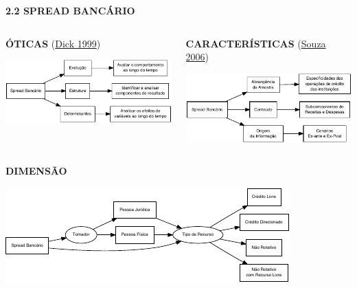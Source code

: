 \documentclass[
  ignorenonframetext,
  aspectratio=169,
  ignorenonframetext]{beamer}
\begin{document}
\begin{frame}{\textbf{2.2 SPREAD BANCÁRIO}}
\protect\hypertarget{spread-bancuxe1rio-1}{}
\begin{columns}[T]
\begin{column}{0.5\textwidth}
\textbf{ÓTICAS} (\protect\hyperlink{ref-dick:1999}{Dick 1999})

\begin{center}\includegraphics{02-final_presentation-V1_files/figure-beamer/diagram.otic-1} \end{center}
\end{column}

\begin{column}{0.5\textwidth}
\textbf{CARACTERÍSTICAS} (\protect\hyperlink{ref-leal:2006}{Souza 2006})

\begin{center}\includegraphics{02-final_presentation-V1_files/figure-beamer/diagram.carac-1} \end{center}
\end{column}
\end{columns}

\textbf{DIMENSÃO}

\begin{center}\includegraphics{02-final_presentation-V1_files/figure-beamer/d.spread.dim-1} \end{center}
\end{frame}
\end{document}
